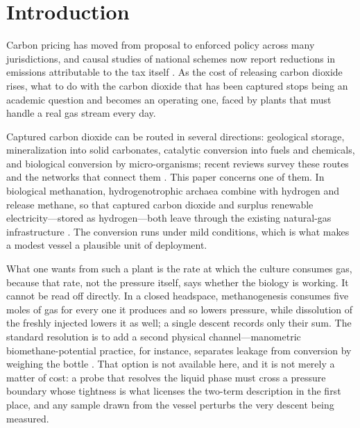 \documentclass[sigconf]{acmart}
\begin{document}


\maketitle


\section{Introduction}
\label{sec:intro}

Carbon pricing has moved from proposal to enforced policy across many
jurisdictions, and causal studies of national schemes now report
reductions in emissions attributable to the tax itself
\cite{gugler2023carbon}. As the cost of releasing carbon dioxide
rises, what to do with the carbon dioxide that has been captured stops
being an academic question and becomes an operating one, faced by
plants that must handle a real gas stream every day.

Captured carbon dioxide can be routed in several directions:
geological storage, mineralization into solid carbonates, catalytic
conversion into fuels and chemicals, and biological conversion by
micro-organisms; recent reviews survey these routes and the networks
that connect them \cite{ghiat2025circularity}. This paper concerns one
of them. In biological methanation, hydrogenotrophic archaea combine
 with hydrogen and release methane, so that captured carbon
dioxide and surplus renewable electricity---stored as hydrogen---both
leave through the existing natural-gas infrastructure
\cite{gonzalez2023biological}. The conversion runs under mild
conditions, which is what makes a modest vessel a plausible unit of
deployment.

What one wants from such a plant is the rate at which the culture
consumes gas, because that rate, not the pressure itself, says whether
the biology is working. It cannot be read off directly. In a closed
headspace, methanogenesis consumes five moles of gas for every one it
produces and so lowers pressure, while dissolution of the freshly
injected  lowers it as well; a single descent records only
their sum. The standard resolution is to add a second physical
channel---manometric biomethane-potential practice, for instance,
separates leakage from conversion by weighing the bottle
\cite{hafner2018quantification}. That option is not available here, and
it is not merely a matter of cost: a probe that resolves the liquid
phase must cross a pressure boundary whose tightness is what licenses
the two-term description in the first place, and any sample drawn from
the vessel perturbs the very descent being measured.
\end{document}
